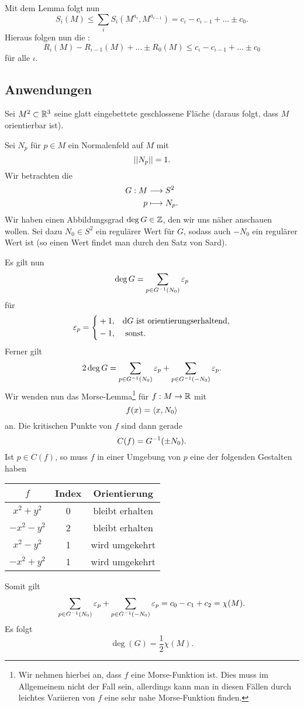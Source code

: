 Mit dem Lemma folgt nun
\[ S_i(M) \leq \sum_i S_i(M^{a_i}, M^{a_{i-1}}) = c_\iota - c_{\iota -1} + \ldots \pm c_0. \]
Hieraus folgen nun die :
\[ R_\iota(M) - R_{\iota-1}(M) + \ldots \pm R_0(M) \leq c_\iota - c_{\iota - 1} + \ldots \pm c_0 \]
für alle $\iota$.

\subsection{Anwendungen}
Sei $M^2\subset \mathbb{R}^3$ seine glatt eingebettete geschlossene Fläche (daraus folgt, dass $M$ orientierbar ist).

Sei $N_p$ für $p \in M$ ein Normalenfeld auf $M$ mit
\[ \left|\left|N_p\right|\right| = 1. \]
Wir betrachten die 
\begin{align*}
G : M & \overset{}{\longrightarrow} S^2\\
p & \longmapsto N_p.
\end{align*}
Wir haben einen Abbildungsgrad $\deg G \in \mathbb{Z}$, den wir uns näher anschauen wollen. Sei dazu $N_0 \in S^2$ ein regulärer Wert für $G$, sodass auch $-N_0$ ein regulärer Wert ist (so einen Wert findet man durch den Satz von Sard).

Es gilt nun
\[ \deg G = \sum_{p \in G^{-1}(N_0)} \varepsilon_p \]
für
\[ \varepsilon_p = \left\lbrace
\begin{aligned}
&+1, && \text{d} G \text{ ist orientierungserhaltend},\\
&-1, && \text{ sonst.}
\end{aligned}
\right. \]
Ferner gilt
\[ 2 \deg G= \sum_{p \in G^{-1}(N_0)} \varepsilon_p + \sum_{p \in G^{-1}(-N_0)} \varepsilon_p. \]
Wir wenden nun das Morse-Lemma\footnote{Wir nehmen hierbei an, dass $f$ eine Morse-Funktion ist. Dies muss im Allgemeinem nicht der Fall sein, allerdings kann man in diesen Fällen durch leichtes Variieren von $f$ eine sehr nahe Morse-Funktion finden.} für $f : M \overset{}{\rightarrow} \mathbb{R}$ mit
\[f(x) = \left<x, N_0\right> \]
an.
Die kritischen Punkte von $f$ sind dann gerade
\[  C(f) = G^{-1}(\pm N_0).\]
Ist $p \in C(f)$, so muss $f$ in einer Umgebung von $p$ eine der folgenden Gestalten haben
\begin{center}
	\begin{tabular}{c|c|c}
		$f$ & Index& Orientierung\\\hline
		$x^2 + y^2$ & 0 & bleibt erhalten\\
		$-x^2 - y^2$ & 2 & bleibt erhalten\\
		$x^2 - y^2$ & 1 & wird umgekehrt\\
		$-x^2 + y^2$ & 1 & wird umgekehrt
	\end{tabular}
\end{center}
Somit gilt
\[ \sum_{p \in G^{-1}(N_0)} \varepsilon_p + \sum_{p \in G^{-1}(-N_0)} \varepsilon_p = c_0 - c_1 + c_2 = \chi(M). \]
Es folgt
\[ \deg(G) = \frac{1}{2} \chi(M). \]
